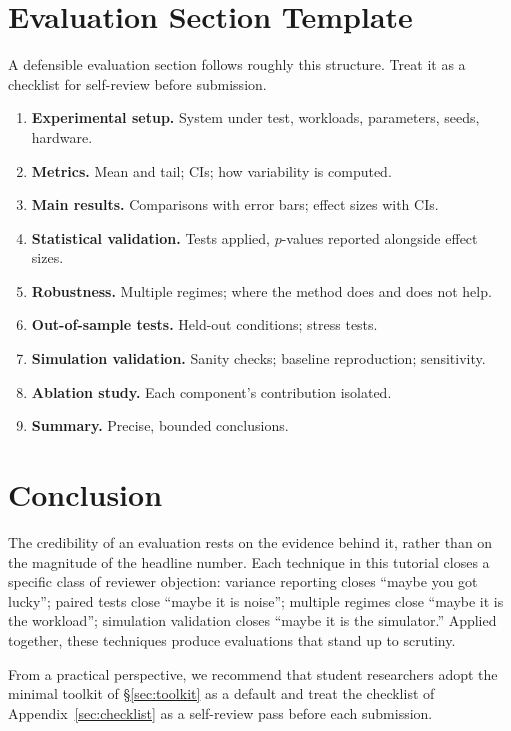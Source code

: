 \documentclass[11pt]{article}
\begin{document}
\section{Evaluation Section Template}
\label{sec:template}

A defensible evaluation section follows roughly this structure. Treat it as a checklist for self-review before submission.

\begin{enumerate}
    \item \textbf{Experimental setup.} System under test, workloads, parameters, seeds, hardware.
    \item \textbf{Metrics.} Mean and tail; CIs; how variability is computed.
    \item \textbf{Main results.} Comparisons with error bars; effect sizes with CIs.
    \item \textbf{Statistical validation.} Tests applied, $p$-values reported alongside effect sizes.
    \item \textbf{Robustness.} Multiple regimes; where the method does and does not help.
    \item \textbf{Out-of-sample tests.} Held-out conditions; stress tests.
    \item \textbf{Simulation validation.} Sanity checks; baseline reproduction; sensitivity.
    \item \textbf{Ablation study.} Each component's contribution isolated.
    \item \textbf{Summary.} Precise, bounded conclusions.
\end{enumerate}

\section{Conclusion}

The credibility of an evaluation rests on the evidence behind it, rather than on the magnitude of the headline number. Each technique in this tutorial closes a specific class of reviewer objection: variance reporting closes ``maybe you got lucky''; paired tests close ``maybe it is noise''; multiple regimes close ``maybe it is the workload''; simulation validation closes ``maybe it is the simulator.'' Applied together, these techniques produce evaluations that stand up to scrutiny.

From a practical perspective, we recommend that student researchers adopt the minimal toolkit of \S\ref{sec:toolkit} as a default and treat the checklist of Appendix~\ref{sec:checklist} as a self-review pass before each submission.
\end{document}
